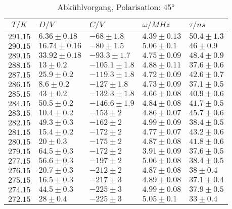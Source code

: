 \begin{table}[h!]
\footnotesize\centering
\begin{tabular}{|c|l|l|l|l|}
\hline
$T/K$&$D/V$&$C/V$&$\omega/MHz$&$\tau/ns$\\\hline\hline
$291.15$&$6.36\pm0.18$&$-68\pm1.8$&$4.39\pm0.13$&$50.4\pm1.3$\\\hline
$290.15$&$16.74\pm0.16$&$-80\pm1.5$&$5.06\pm0.1$&$46\pm0.9$\\\hline
$289.15$&$33.92\pm0.18$&$-93.3\pm1.7$&$4.75\pm0.09$&$48.4\pm0.9$\\\hline
$288.15$&$13\pm0.2$&$-105.1\pm1.8$&$4.88\pm0.11$&$37.6\pm0.6$\\\hline
$287.15$&$25.9\pm0.2$&$-119.3\pm1.8$&$4.72\pm0.09$&$42.6\pm0.7$\\\hline
$286.15$&$8.6\pm0.2$&$-127\pm1.8$&$4.73\pm0.09$&$37.1\pm0.5$\\\hline
$285.15$&$43\pm0.2$&$-132.3\pm1.8$&$4.66\pm0.08$&$40.9\pm0.6$\\\hline
$284.15$&$50.5\pm0.2$&$-146.6\pm1.9$&$4.84\pm0.08$&$41.7\pm0.5$\\\hline
$283.15$&$10.4\pm0.2$&$-153\pm2$&$4.86\pm0.07$&$45.7\pm0.6$\\\hline
$282.15$&$49.3\pm0.3$&$-162\pm2$&$4.99\pm0.09$&$38.4\pm0.5$\\\hline
$281.15$&$15.4\pm0.2$&$-172\pm2$&$4.77\pm0.07$&$43.2\pm0.6$\\\hline
$280.15$&$20\pm0.3$&$-175\pm2$&$4.87\pm0.08$&$41.8\pm0.6$\\\hline
$279.15$&$64.5\pm0.3$&$-172\pm2$&$3.91\pm0.09$&$37.6\pm0.5$\\\hline
$277.15$&$56.6\pm0.3$&$-197\pm2$&$5.06\pm0.08$&$38.4\pm0.5$\\\hline
$276.15$&$20.7\pm0.3$&$-212\pm2$&$4.87\pm0.08$&$38\pm0.4$\\\hline
$275.15$&$16.5\pm0.3$&$-217\pm3$&$4.89\pm0.08$&$37.1\pm0.4$\\\hline
$274.15$&$44.5\pm0.3$&$-225\pm3$&$4.99\pm0.08$&$37.9\pm0.5$\\\hline
$272.15$&$28\pm0.4$&$-225\pm3$&$5.05\pm0.1$&$33\pm0.4$\\\hline
\end{tabular}
\caption{Abkühlvorgang, Polarisation: 45°\label{cold45}}
\end{table}
